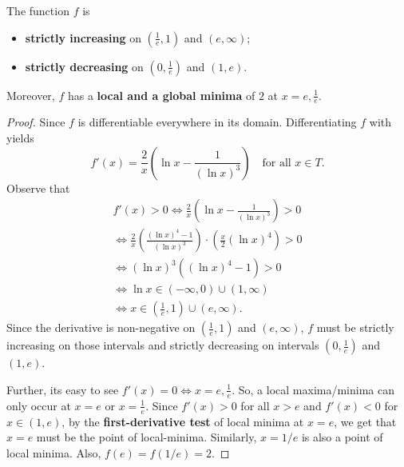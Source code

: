 \documentclass[numbers=endperiod, 11pt]{scrartcl}
\begin{document}
\begin{sol}
    \begin{claim*}
        The function $f$ is
        \begin{itemize}
            \item \textbf{strictly increasing} on $\displaystyle \left( \frac 1 e , 1 \right)$ and $(e,\infty)$;
            \item \textbf{strictly decreasing} on $\displaystyle \left( 0, \frac 1 e \right)$ and $(1,e)$.
        \end{itemize}
        Moreover, $f$ has a \textbf{local and a global
            minima} of $2$ at $x = e, \frac 1 e$.
    \end{claim*}
    \begin{proof}
        Since $f$ is differentiable everywhere in its
        domain. Differentiating $f$ with yields
        \[ f'(x) = \frac 2 x \left( \ln x - \frac{1}{(\ln x)^3} \right) \quad \text{for all }x \in T.\]
        Observe that
        \begin{align*}
            f'(x) > 0 \iff \frac 2 x \left(\ln x - \frac{1}{(\ln x)^3}\right) > 0                                     \\
            \iff \frac 2 x \left( \frac{(\ln x)^4 - 1}{(\ln x)^3} \right)\cdot \left( \frac x 2 (\ln x)^4 \right) > 0 \\
            \iff (\ln x)^3 \left( (\ln x)^4 - 1 \right) > 0                                                           \\
            \iff \ln x \in (-\infty, 0) \cup (1,\infty)                                                               \\
            \iff x \in \left( \frac 1 e , 1\right) \cup (e,\infty).
        \end{align*}
        Since the derivative is non-negative on
        $\left( \frac 1 e , 1 \right)$ and $(e,\infty)$,
        $f$ must be strictly increasing on those intervals
        and strictly decreasing on intervals
        $\left( 0, \frac 1 e \right)$ and $(1,e)$.
        \vspace{1.2mm}

        Further, its easy to see
        $f'(x) = 0 \iff x = e,\frac 1 e$. So, a local
        maxima/minima can only occur at $x = e$ or
        $x = \frac 1 e$. Since $f'(x) > 0$ for all
        $x > e$ and $f'(x) < 0$ for $x \in (1,e)$,
        by the \textbf{first-derivative test} of
        local minima at $x = e$, we get that $x = e$
        must be the point of local-minima. Similarly,
        $x = 1/e$ is also a point of local minima. Also,
        $f(e) = f(1/e) = 2$.


\end{proof}
\end{sol}
\end{document}
